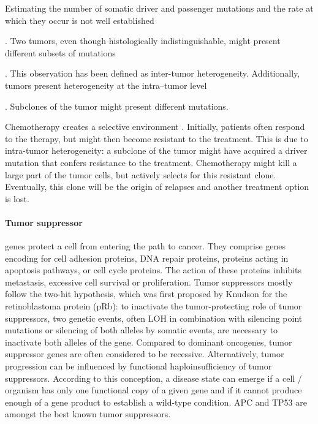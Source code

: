       Estimating the number of somatic driver and passenger mutations and the
      rate at which they occur is not well established {\cite{driver_passenger}.
      Two tumors, even though histologically indistinguishable, might present
      different subsets of mutations {\cite{driver_passenger}
      {\cite{intertumor}}. This observation has been defined as inter-tumor
      heterogeneity. Additionally, tumors present heterogeneity at the
      intra--tumor level {\cite{intratumor}. Subclones of the tumor might
      present different mutations.

      Chemotherapy creates a selective environment {\cite{selective_chemo}}.
      Initially, patients often respond to the therapy, but might then become
      resistant to the treatment. This is due to intra-tumor heterogeneity: a
      subclone of the tumor might have acquired a driver mutation that confers
      resistance to the treatment. Chemotherapy might kill a large part of the
      tumor cells, but actively selects for this resistant clone. Eventually,
      this clone will be the origin of relapses and another treatment option is
      lost.

      \paragraph{Tumor suppressor} genes protect a cell from entering the path
      to cancer. They comprise genes encoding for cell adhesion proteins,  DNA
      repair proteins, proteins acting in apoptosis pathways, or cell cycle
      proteins. The action of these proteins inhibits metastasis, excessive cell
      survival or proliferation. Tumor suppressors mostly follow the two-hit
      hypothesis, which was first proposed by Knudson for the retinoblastoma
      protein (pRb): to inactivate the tumor-protecting role of tumor
      suppressors, two genetic events, often LOH in  combination with silencing
      point mutations or silencing of both alleles by somatic events, are
      necessary to inactivate both alleles of the gene.
      Compared to dominant oncogenes, tumor suppressor genes are often
      considered to be recessive. Alternatively, tumor progression can be
      influenced by functional haploinsufficiency of tumor suppressors.
      According to this conception, a disease state can emerge if a cell /
      organism has only one functional copy of a given gene and if it cannot
      produce enough of a gene product to establish a wild-type condition. APC
      and TP53 are amongst the best known tumor suppressors.

}}}
